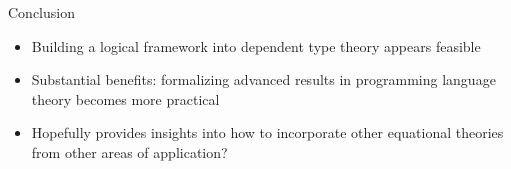 \documentclass[usenames,dvipsnames]{beamer}
\begin{document}

\begin{frame}{Conclusion}
\begin{itemize}
\item Building a logical framework into dependent type theory appears feasible
\item Substantial benefits: formalizing advanced results in programming language theory becomes more practical
\item Hopefully provides insights into how to incorporate other equational theories from other areas of application?
\end{itemize}
\end{frame}
\end{document}

